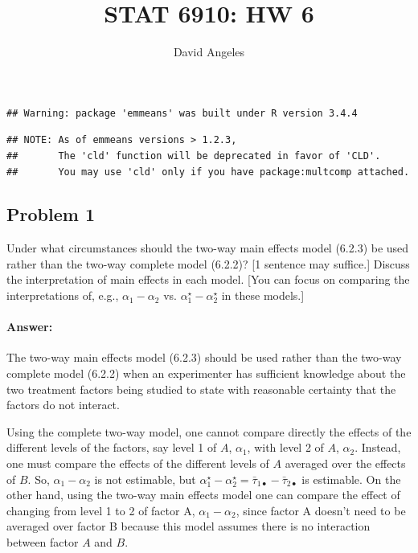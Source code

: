\documentclass[12pt,]{article}
\title{STAT 6910: HW 6}
\author{David Angeles}
\date{}
\let\oldparagraph\paragraph
\renewcommand{\paragraph}[1]{\oldparagraph{#1}\mbox{}}
\begin{document}
\maketitle

\begin{verbatim}
## Warning: package 'emmeans' was built under R version 3.4.4
\end{verbatim}

\begin{verbatim}
## NOTE: As of emmeans versions > 1.2.3,
##       The 'cld' function will be deprecated in favor of 'CLD'.
##       You may use 'cld' only if you have package:multcomp attached.
\end{verbatim}

\subsection{Problem 1}\label{problem-1}

Under what circumstances should the two-way main effects model (6.2.3)
be used rather than the two-way complete model (6.2.2)? {[}1 sentence
may suffice.{]} Discuss the interpretation of main effects in each
model. {[}You can focus on comparing the interpretations of, e.g.,
\(\alpha_1 - \alpha_2\) vs. \(\alpha_1^\star - \alpha_2^\star\) in these
models.{]}

\paragraph{Answer:}\label{answer}

The two-way main effects model (6.2.3) should be used rather than the
two-way complete model (6.2.2) when an experimenter has sufficient
knowledge about the two treatment factors being studied to state with
reasonable certainty that the factors do not interact.

Using the complete two-way model, one cannot compare directly the
effects of the different levels of the factors, say level 1 of \(A\),
\(\alpha_1\), with level 2 of \(A\), \(\alpha_2\). Instead, one must
compare the effects of the different levels of \(A\) averaged over the
effects of \(B\). So, \(\alpha_1-\alpha_2\) is not estimable, but
\(\alpha^\star_1-\alpha^\star_2=\bar{\tau}_{1\bullet}-\bar{\tau}_{2\bullet}\)
is estimable. On the other hand, using the two-way main effects model
one can compare the effect of changing from level 1 to 2 of factor A,
\(\alpha_1 - \alpha_2\), since factor A doesn't need to be averaged over
factor B because this model assumes there is no interaction between
factor \(A\) and \(B\).
\end{document}
